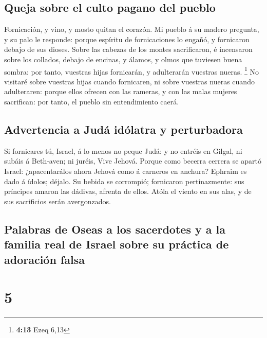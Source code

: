 \hypertarget{queja-sobre-el-culto-pagano-del-pueblo}{%
\subsection{Queja sobre el culto pagano del
pueblo}\label{queja-sobre-el-culto-pagano-del-pueblo}}

 Fornicación, y vino, y mosto quitan el corazón.
 Mi pueblo á su madero pregunta, y su palo le responde:
porque espíritu de fornicaciones lo engañó, y fornicaron debajo de sus
dioses.  Sobre las cabezas de los montes sacrificaron, é
incensaron sobre los collados, debajo de encinas, y álamos, y olmos que
tuviesen buena sombra: por tanto, vuestras hijas fornicarán, y
adulterarán vuestras nueras. \footnote{\textbf{4:13} Ezeq 6,13}
 No visitaré sobre vuestras hijas cuando fornicaren, ni
sobre vuestras nueras cuando adulteraren: porque ellos ofrecen con las
rameras, y con las malas mujeres sacrifican: por tanto, el pueblo sin
entendimiento caerá.

\hypertarget{advertencia-a-juduxe1-iduxf3latra-y-perturbadora}{%
\subsection{Advertencia a Judá idólatra y
perturbadora}\label{advertencia-a-juduxe1-iduxf3latra-y-perturbadora}}

 Si fornicares tú, Israel, á lo menos no peque Judá: y no
entréis en Gilgal, ni subáis á Beth-aven; ni juréis, Vive Jehová.
 Porque como becerra cerrera se apartó Israel:
¿apacentarálos ahora Jehová como á carneros en anchura? 
Ephraim es dado á ídolos; déjalo.  Su bebida se corrompió;
fornicaron pertinazmente: sus príncipes amaron las dádivas, afrenta de
ellos.  Atóla el viento en sus alas, y de sus sacrificios
serán avergonzados.

\hypertarget{palabras-de-oseas-a-los-sacerdotes-y-a-la-familia-real-de-israel-sobre-su-pruxe1ctica-de-adoraciuxf3n-falsa}{%
\subsection{Palabras de Oseas a los sacerdotes y a la familia real de
Israel sobre su práctica de adoración
falsa}\label{palabras-de-oseas-a-los-sacerdotes-y-a-la-familia-real-de-israel-sobre-su-pruxe1ctica-de-adoraciuxf3n-falsa}}

\hypertarget{section-4}{%
\section{5}\label{section-4}}

